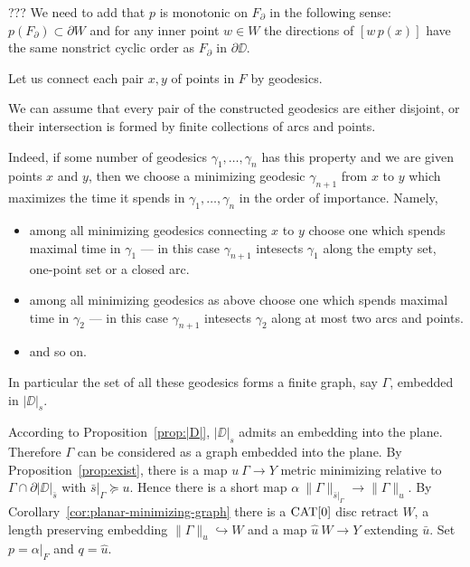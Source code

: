 \documentclass{article}
\begin{document}
??? We need to add that $p$ is monotonic on $F_{\partial}$ in the following sense:
$p(F_\partial)\subset \partial W$ and for any inner point $w\in W$ the directions of $[w\,p(x)]$ have the same nonstrict cyclic order as  $F_{\partial}$ in $\partial\DD$. 

Let us connect each pair $x,y$ of points in $F$ by geodesics.

We can assume that 
every pair of the constructed geodesics 
are either disjoint, or their intersection is formed by finite collections of arcs and points.

Indeed, if some number of geodesics $\gamma_1,\dots,\gamma_n$ has this property and we are given points $x$ and $y$, then
we choose a minimizing geodesic $\gamma_{n+1}$ from $x$ to $y$ which maximizes the time it spends in $\gamma_1,\dots,\gamma_n$  in the order of importance.
Namely, 
\begin{itemize}
\item  among all minimizing geodesics connecting $x$ to $y$
choose one which spends maximal time in $\gamma_1$ --- in this case $\gamma_{n+1}$ intesects $\gamma_1$ along the empty set, one-point set or a closed arc.
\item among all minimizing geodesics as above
choose one which spends maximal time in $\gamma_2$ --- in this case $\gamma_{n+1}$ intesects $\gamma_2$ along at most two arcs and points.
\item and so on.
\end{itemize}


In particular the set of all these geodesics forms a finite graph, say $\Gamma$,
embedded in $|\DD|_s$. 

According to Proposition~\ref{prop:|D|},
$|\DD|_s$ admits an embedding into the plane.
Therefore $\Gamma$ can be considered as a graph embedded into the plane.
By Proposition~\ref{prop:exist}, there is a map $u\:\Gamma\to Y$ metric minimizing relative to $\Gamma\cap\partial|\DD|_{\bar s}$ with
$\bar s|_\Gamma\succcurlyeq u$.
Hence there is a short map $\alpha\:\|\Gamma\|_{\bar s|_\Gamma}\to\|\Gamma\|_u$. 
By Corollary~\ref{cor:planar-minimizing-graph} there is a $\mathop{\rm CAT}\nolimits[0]$ disc retract $W$, a length preserving embedding
$\|\Gamma\|_u\hookrightarrow W$ and a map $\hat u\:W\to Y$ extending $\bar u$. %
Set $p=\alpha|_F$ and $q=\hat u$.
\qeds
\end{document}
